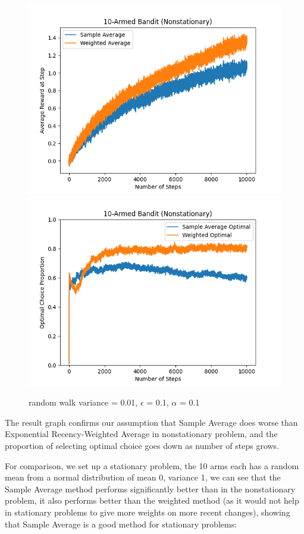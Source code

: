 \documentclass{article}
\begin{document}
\begin{figure}[h!]
\centering
\includegraphics[scale=.6]{RL_A1_pics/dif_arms/num_steps=10000, num_experiments=1000, arms=10, var=1, rand_walk_var=0.01, alpha=0.1, epsilon=0.1.png}
\includegraphics[scale=.6]{RL_A1_pics/dif_arms/optimal/10.png}
\caption{random walk variance = 0.01, $\epsilon$ = 0.1, $\alpha$ = 0.1}
\label{fig:10-Armed1}
\end{figure}

The result graph confirms our assumption that Sample Average does worse than Exponential Recency-Weighted Average in nonstationary problem, and the proportion of selecting optimal choice goes down as number of steps grows.

For comparison, we set up a stationary problem, the 10 arms each has a random mean from a normal distribution of mean 0, variance 1, we can see that the Sample Average method performs significantly better than in the nonstationary problem, it also performs better than the weighted method (as it would not help in stationary problems to give more weights on more recent changes), showing that Sample Average is a good method for stationary problems:
\end{document}
